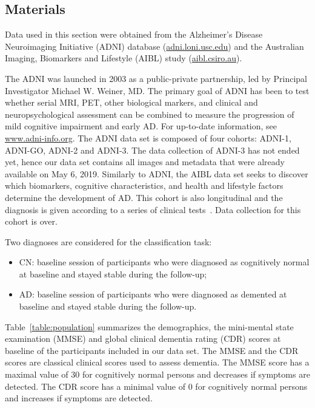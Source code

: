 \documentclass[10pt,journal,compsoc]{IEEEtran}
\begin{document}
\subsection{Materials}

Data used in this section were obtained from the Alzheimer’s Disease
Neuroimaging Initiative (ADNI) database  (\href{http://adni.loni.usc.edu/}{adni.loni.usc.edu}) and the Australian Imaging, Biomarkers and Lifestyle (AIBL) study (\href{https://aibl.csiro.au/}{aibl.csiro.au}).

The ADNI was launched in 2003 as a public-private partnership, led by Principal Investigator Michael W. Weiner, MD. The primary goal of ADNI has been to test whether serial MRI, PET, other biological markers, and clinical and neuropsychological assessment can be combined to measure the progression of mild cognitive impairment and early AD. For up-to-date information, see \href{www.adni-info.org}{www.adni-info.org}. The ADNI data set is composed of four cohorts: ADNI-1, ADNI-GO, ADNI-2 and ADNI-3. The data collection of ADNI-3 has not ended yet, hence our data set contains all images and metadata that were already available on May 6, 2019.
Similarly to ADNI, the AIBL data set seeks to discover which biomarkers, cognitive characteristics, and health and lifestyle factors determine the development of AD. This cohort is also longitudinal and the diagnosis is given according to a series of clinical tests~\cite{ellis_australian_2009}. Data collection for this cohort is over. 

Two diagnoses are considered for the classification task:
\begin{itemize}
    \item CN: baseline session of participants who were diagnosed as cognitively normal at baseline and stayed stable during the follow-up;
    \item AD: baseline session of participants who were diagnosed as demented at baseline and stayed stable during the follow-up.
\end{itemize}
Table~\ref{table:population} summarizes the demographics, the mini-mental state examination (MMSE) and global clinical dementia rating (CDR) scores at baseline of the participants included in our data set. The MMSE and the CDR scores are classical clinical scores used to assess dementia. The MMSE score has a maximal value of 30 for cognitively normal persons and decreases if symptoms are detected. The CDR score has a minimal value of 0 for cognitively normal persons and increases if symptoms are detected. 
\end{document}
